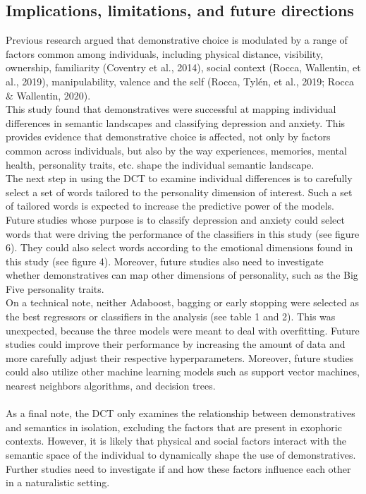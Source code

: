 \documentclass[11pt, a4paper]{article}
\begin{document}
\subsection{Implications, limitations, and future directions}
Previous research argued that demonstrative choice is modulated by a range of factors common among individuals, including physical distance, visibility, ownership, familiarity (Coventry et al., 2014), social context (Rocca, Wallentin, et al., 2019), manipulability, valence and the self (Rocca, Tylén, et al., 2019; Rocca \& Wallentin, 2020). \\
This study found that demonstratives were successful at mapping individual differences in semantic landscapes and classifying depression and anxiety. This provides evidence that demonstrative choice is affected, not only by factors common across individuals, but also by the way experiences, memories, mental health, personality traits, etc. shape the individual semantic landscape. \\

The next step in using the DCT to examine individual differences is to carefully select a set of words tailored to the personality dimension of interest. Such a set of tailored words is expected to increase the predictive power of the models. Future studies whose purpose is to classify depression and anxiety could select words that were driving the performance of the classifiers in this study (see figure 6). They could also select words according to the emotional dimensions found in this study (see figure 4). Moreover, future studies also need to investigate whether demonstratives can map other dimensions of personality, such as the Big Five personality traits. \\

On a technical note, neither Adaboost, bagging or early stopping were selected as the best regressors or classifiers in the analysis (see table 1 and 2). This was unexpected, because the three models were meant to deal with overfitting. Future studies could improve their performance by increasing the amount of data and more carefully adjust their respective hyperparameters. Moreover, future studies could also utilize other machine learning models such as support vector machines, nearest neighbors algorithms, and decision trees.\\ \\

As a final note, the DCT only examines the relationship between demonstratives and semantics in isolation, excluding the factors that are present in exophoric contexts. However, it is likely that physical and social factors interact with the semantic space of the individual to dynamically shape the use of demonstratives. Further studies need to investigate if and how these factors influence each other in a naturalistic setting.  
\end{document}
